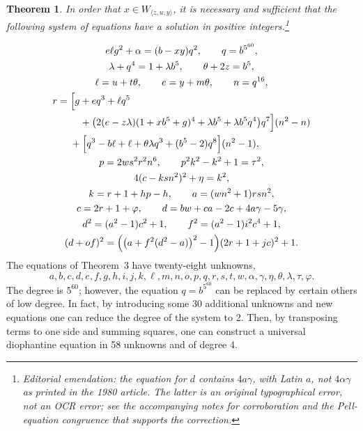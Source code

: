 \documentclass[11pt,letterpaper]{article}
\newcommand{\origpage}[1]{\marginnote{\footnotesize\textbf{[#1]}}}
\newtheorem{theorem}{Theorem}
\begin{document}
\newpage
\enlargethispage{4\baselineskip}
\begin{theorem}
In order that $x\in W_{\langle z,u,y\rangle}$, it is necessary and
sufficient that the following system of equations have a solution in
positive integers.\footnote{Editorial emendation: the equation for $d$
contains $4a\gamma$, with Latin $a$, not $4\alpha\gamma$ as printed in the
1980 article. The latter is an original typographical error, not an OCR
error; see the accompanying notes for corroboration and the Pell-equation
congruence that supports the correction.}
\end{theorem}
\[
\begin{gathered}
 e\ell g^2+\alpha=(b-xy)q^2,\qquad q=b^{5^{60}},\\
 \lambda+q^4=1+\lambda b^5,\qquad \theta+2z=b^5,\\
 \ell=u+t\theta,\qquad e=y+m\theta,\qquad n=q^{16},\\
\begin{aligned}
 r={}&\Bigl[g+eq^3+\ell q^5\\
     &\quad+\bigl(2(e-z\lambda)(1+xb^5+g)^4
                   +\lambda b^5+\lambda b^5q^4\bigr)q^7\Bigr](n^2-n)\\
     &+\Bigl[q^3-b\ell+\ell+\theta\lambda q^3+(b^5-2)q^8\Bigr](n^2-1),
\end{aligned}\\
 p=2ws^2r^2n^6,\qquad p^2k^2-k^2+1=\tau^2,\\
 4(c-ksn^2)^2+\eta=k^2,\\
 k=r+1+hp-h,\qquad a=(wn^2+1)rsn^2,\\
 c=2r+1+\varphi,\qquad d=bw+ca-2c+4a\gamma-5\gamma,\\
 d^2=(a^2-1)c^2+1,\qquad f^2=(a^2-1)i^2c^4+1,\\
 (d+of)^2=\Bigl(\bigl(a+f^2(d^2-a)\bigr)^2-1\Bigr)(2r+1+jc)^2+1.
\end{gathered}
\]
The equations of Theorem~3 have twenty-eight unknowns,
\[
 a,b,c,d,e,f,g,h,i,j,k,\ell,m,n,o,p,q,r,s,t,w,
 \alpha,\gamma,\eta,\theta,\lambda,\tau,\varphi.
\]
The degree is $5^{60}$; however, the equation $q=b^{5^{60}}$ can be
replaced by certain others of low degree. In fact, by introducing some
30 additional unknowns and new equations one can reduce the degree of
the system to 2. Then, by transposing terms to one side and summing
squares, one can construct a universal diophantine equation in
58 unknowns and of degree 4.
\end{document}
